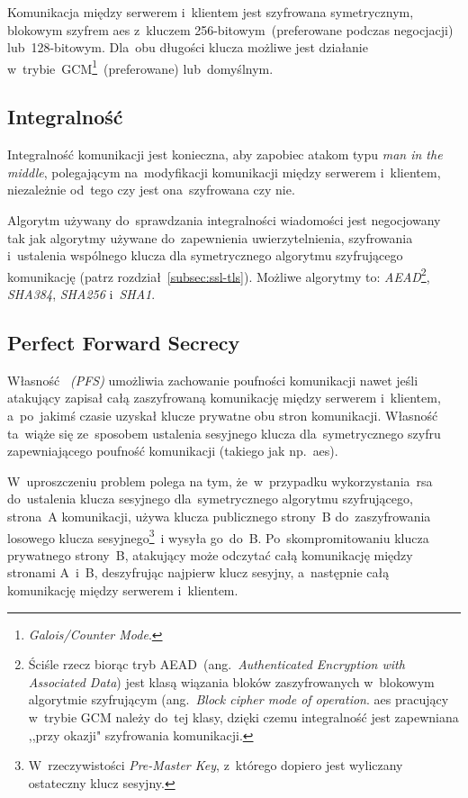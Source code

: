 \documentclass[thesis]{subfiles}
\begin{document}
Komunikacja między serwerem i~klientem jest szyfrowana symetrycznym, blokowym szyfrem \gls{aes} z~kluczem 256-bitowym~(preferowane podczas negocjacji) lub~128-bitowym. Dla~obu długości klucza możliwe jest działanie w~trybie~GCM\footnote{\emph{Galois/Counter Mode}.}~(preferowane) lub~domyślnym.


\subsection{Integralność}

Integralność komunikacji jest konieczna, aby zapobiec atakom typu \emph{man in the middle}, polegającym na~modyfikacji komunikacji między serwerem i~klientem, niezależnie od~tego czy jest ona~szyfrowana czy nie.

Algorytm używany do~sprawdzania integralności wiadomości jest negocjowany tak jak algorytmy używane do~zapewnienia uwierzytelnienia, szyfrowania i~ustalenia wspólnego klucza dla symetrycznego algorytmu szyfrującego komunikację (patrz rozdział~\ref{subsec:ssl-tls}). Możliwe algorytmy to: \emph{AEAD}\footnote{Ściśle rzecz biorąc tryb AEAD~(ang.~\emph{Authenticated Encryption with Associated Data}) jest klasą wiązania bloków zaszyfrowanych w~blokowym algorytmie szyfrującym (ang.~\emph{Block cipher mode of operation}. \gls{aes} pracujący w~trybie GCM należy do~tej klasy, dzięki czemu integralność jest zapewniana ,,przy okazji" szyfrowania komunikacji.}, \emph{SHA384}, \emph{SHA256} i~\emph{SHA1}.


\subsection{Perfect Forward Secrecy}
\label{subsec:pfs}

Własność \emph{~(PFS)} umożliwia zachowanie poufności komunikacji nawet jeśli atakujący zapisał całą zaszyfrowaną komunikację między serwerem i~klientem, a~po~jakimś czasie uzyskał klucze prywatne obu stron komunikacji. Własność ta~wiąże się ze~sposobem ustalenia sesyjnego klucza dla~symetrycznego szyfru zapewniającego poufność komunikacji (takiego jak np.~\gls{aes}).

W~uproszczeniu problem polega na tym, że~w~przypadku wykorzystania~\gls{rsa} do~ustalenia klucza sesyjnego dla~symetrycznego algorytmu szyfrującego, strona~A komunikacji, używa klucza publicznego strony~B do~zaszyfrowania losowego klucza sesyjnego\footnote{W~rzeczywistości \emph{Pre-Master Key}, z~którego dopiero jest wyliczany ostateczny klucz sesyjny.}~i wysyła go~do~B. Po~skompromitowaniu klucza prywatnego strony~B, atakujący może odczytać całą komunikację między stronami A~i~B, deszyfrując najpierw klucz sesyjny, a~następnie całą komunikację między serwerem i~klientem.
\end{document}

